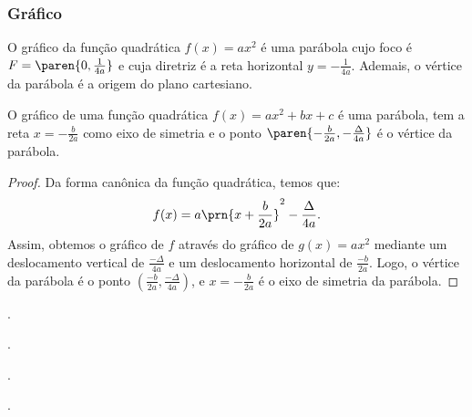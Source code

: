 \subsubsection{Gráfico}

\begin{example}
O gráfico da função quadrática $f(x) = ax^2$ é uma parábola cujo
foco é $F = \paren{0, \frac 1 {4a}}$ e cuja diretriz é a reta
horizontal $y = -\frac{1}{4a}$. Ademais, o vértice da parábola é a
origem do plano cartesiano.
\end{example}

\begin{proposition}
O gráfico de uma função quadrática $f(x) = ax^2 + bx + c$ é uma
parábola, tem a reta $x = -\frac {b}{2a}$ como eixo de simetria e o
ponto $\paren{-\frac {b} {2a}, -\frac {\Delta} {4a}}$ é o vértice da
parábola.
\end{proposition}

\begin{proof}
	Da forma canônica da função quadrática, temos que:
	\[
		f(x) = a\prn{x+\frac b {2a}}^2 - \frac{\Delta}{4a}.
	\]
	\noindent Assim, obtemos o gráfico de $f$ através do gráfico de $g(x) = ax^2$
	mediante um deslocamento vertical de $\frac{-\Delta}{4a}$ e um deslocamento
	horizontal de $\frac{-b}{2a}$.
	Logo, o vértice da parábola é o ponto $(\frac{-b}{2a}, \frac{-\Delta}{4a})$, e 
	$x=-\frac{b}{2a}$ é o eixo de simetria da parábola.
\end{proof}

\begin{onlineact}
	.
\end{onlineact}

\begin{onlineact}
	.
\end{onlineact}

\begin{onlineact}
	.
\end{onlineact}

\begin{onlineact}
	.
\end{onlineact}